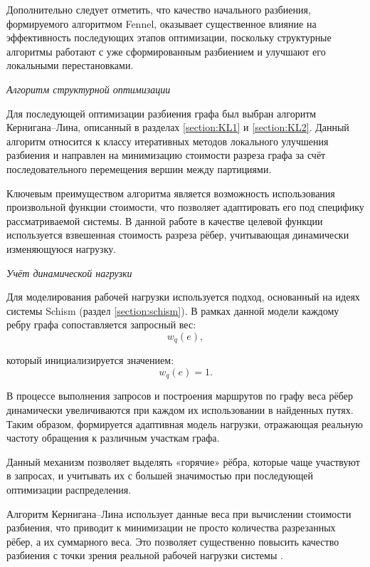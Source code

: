Дополнительно следует отметить, что качество начального разбиения, формируемого алгоритмом Fennel, оказывает существенное влияние на эффективность последующих этапов оптимизации, поскольку структурные алгоритмы работают с уже сформированным разбиением и улучшают его локальными перестановками.

\textit{Алгоритм структурной оптимизации}

Для последующей оптимизации разбиения графа был выбран алгоритм Кернигана--Лина, описанный в разделах \ref{section:KL1} и \ref{section:KL2}. Данный алгоритм относится к классу итеративных методов локального улучшения разбиения и направлен на минимизацию стоимости разреза графа за счёт последовательного перемещения вершин между партициями.

Ключевым преимуществом алгоритма является возможность использования произвольной функции стоимости, что позволяет адаптировать его под специфику рассматриваемой системы. В данной работе в качестве целевой функции используется взвешенная стоимость разреза рёбер, учитывающая динамически изменяющуюся нагрузку.

\textit{Учёт динамической нагрузки}

Для моделирования рабочей нагрузки используется подход, основанный на идеях системы Schism (раздел \ref{section:schism}). В рамках данной модели каждому ребру графа сопоставляется запросный вес:
\begin{equation*}
w_q(e),
\end{equation*}

который инициализируется значением:
\begin{equation*}
w_q(e) = 1.
\end{equation*}

В процессе выполнения запросов и построения маршрутов по графу веса рёбер динамически увеличиваются при каждом их использовании в найденных путях. Таким образом, формируется адаптивная модель нагрузки, отражающая реальную частоту обращения к различным участкам графа.

Данный механизм позволяет выделять «горячие» рёбра, которые чаще участвуют в запросах, и учитывать их с большей значимостью при последующей оптимизации распределения.

Алгоритм Кернигана--Лина использует данные веса при вычислении стоимости разбиения, что приводит к минимизации не просто количества разрезанных рёбер, а их суммарного веса. Это позволяет существенно повысить качество разбиения с точки зрения реальной рабочей нагрузки системы \cite{MetisOG}.

